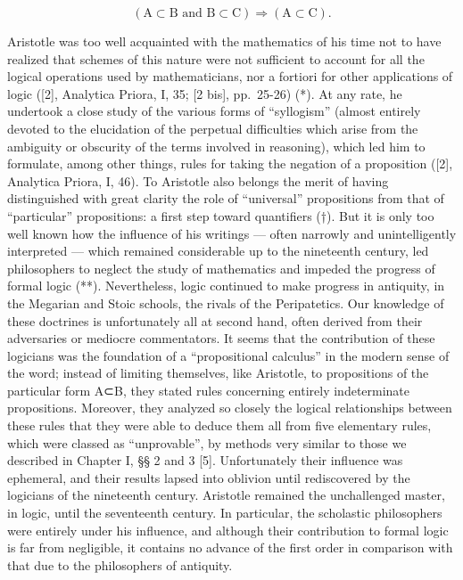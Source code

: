\[
(\mathrm{A} \subset \mathrm{B} \text {   and   } \mathrm{B} \subset \mathrm{C}) \Longrightarrow (\mathrm{A} \subset \mathrm{C}).
\]

Aristotle was too well acquainted with the mathematics of his time not to have realized that schemes of this nature were not sufficient to account for all the logical operations used by mathematicians, nor a fortiori for other applications of logic ({[}2{]}, Analytica Priora, I, 35; {[}2 bis{]}, pp.~25-26) (*). At any rate, he undertook a close study of the various forms of ``syllogism'' (almost entirely devoted to the elucidation of the perpetual difficulties which arise from the ambiguity or obscurity of the terms involved in reasoning), which led him to formulate, among other things, rules for taking the negation of a proposition ({[}2{]}, Analytica Priora, I, 46). To Aristotle also belongs the merit of having distinguished with great clarity the role of ``universal'' propositions from that of ``particular'' propositions: a first step toward quantifiers (†). But it is only too well known how the influence of his writings --- often narrowly and unintelligently interpreted --- which remained considerable up to the nineteenth century, led philosophers to neglect the study of mathematics and impeded the progress of formal logic (**). Nevertheless, logic continued to make progress in antiquity, in the Megarian and Stoic schools, the rivals of the Peripatetics. Our knowledge of these doctrines is unfortunately all at second hand, often derived from their adversaries or mediocre commentators. It seems that the contribution of these logicians was the foundation of a ``propositional calculus'' in the modern sense of the word; instead of limiting themselves, like Aristotle, to propositions of the particular form A⊂B, they stated rules concerning entirely indeterminate propositions. Moreover, they analyzed so closely the logical relationships between these rules that they were able to deduce them all from five elementary rules, which were classed as ``unprovable'', by methods very similar to those we described in Chapter I, §§ 2 and 3 {[}5{]}. Unfortunately their influence was ephemeral, and their results lapsed into oblivion until rediscovered by the logicians of the nineteenth century. Aristotle remained the unchallenged master, in logic, until the seventeenth century. In particular, the scholastic philosophers were entirely under his influence, and although their contribution to formal logic is far from negligible, it contains no advance of the first order in comparison with that due to the philosophers of antiquity.

